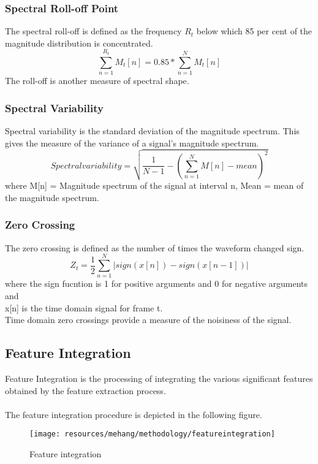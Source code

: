 \subsubsection{Spectral Roll-off Point}
The spectral roll-off is defined as the frequency $R_t$ below which 85 per cent of the magnitude distribution is concentrated.
\begin{equation}
        \sum_{n=1}^{R_t}M_t[n] = 0.85*\sum_{n=1}^{N}{M_t[n]}
\end{equation}
The roll-off is another measure of spectral shape.

\subsubsection{Spectral Variability}
  Spectral variability is the standard deviation of the magnitude spectrum. This gives the 
  measure of the variance of a signal's magnitude spectrum. 
  \begin{equation}
          Spectral variability = \sqrt{\frac{1}{N-1}-(\sum_{n=1}^{N}{M[n]-mean})^2}
  \end{equation}
  where M[n] = Magnitude spectrum of the signal at interval n,
  Mean = mean of the magnitude spectrum.

\subsubsection{Zero Crossing}
The zero crossing is defined as the number of times the waveform changed sign.
\begin{equation}
        Z_t = \frac{1}{2}\sum_{n=1}^{N}{|sign(x[n])-sign(x[n-1])|}
\end{equation}
where the sign fucntion is 1 for positive arguments and 0 for negative arguments and\\
x[n] is the time domain signal for frame t.\\
Time domain zero crossings provide a measure of the noisiness of the signal.

\subsection{Feature Integration}
Feature Integration is the processing of integrating the various significant features obtained by the feature extraction process.\\
\\
The feature integration procedure is depicted in the following figure.
\begin{figure}[h!]
        \centering
        \texttt{[image: resources/mehang/methodology/featureintegration]}
        \caption{Feature integration}
\end{figure}

